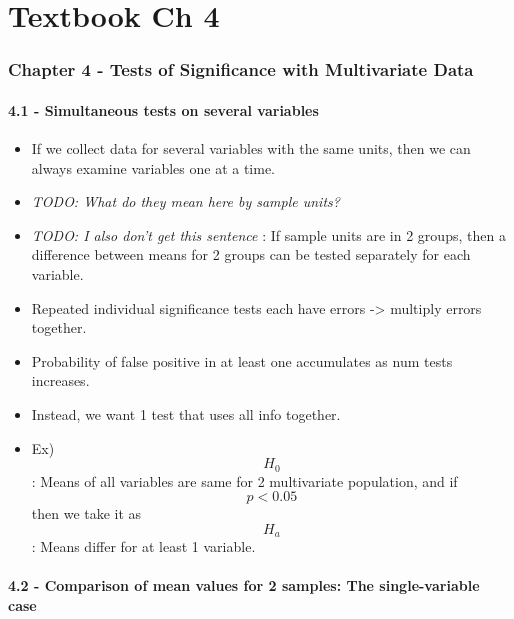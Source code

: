 \hypertarget{textbook-ch-4}{%
\chapter{Textbook Ch 4}\label{textbook-ch-4}}

\hypertarget{chapter-4---tests-of-significance-with-multivariate-data}{%
\subsection{Chapter 4 - Tests of Significance with Multivariate
Data}\label{chapter-4---tests-of-significance-with-multivariate-data}}

\hypertarget{simultaneous-tests-on-several-variables}{%
\subsubsection{4.1 - Simultaneous tests on several
variables}\label{simultaneous-tests-on-several-variables}}

\begin{itemize}
\tightlist
\item
  If we collect data for several variables with the same units, then we
  can always examine variables one at a time.
\item
  \emph{TODO: What do they mean here by sample units?}
\item
  \emph{TODO: I also don't get this sentence} : If sample units are in 2
  groups, then a difference between means for 2 groups can be tested
  separately for each variable.
\item
  Repeated individual significance tests each have errors
  -\textgreater{} multiply errors together.
\item
  Probability of false positive in at least one accumulates as num tests
  increases.
\item
  Instead, we want 1 test that uses all info together.
\item
  Ex) \[H_0\]: Means of all variables are same for 2 multivariate
  population, and if \[p < 0.05\] then we take it as \[H_a\]: Means
  differ for at least 1 variable.
\end{itemize}

\hypertarget{comparison-of-mean-values-for-2-samples-the-single-variable-case}{%
\subsubsection{4.2 - Comparison of mean values for 2 samples: The
single-variable
case}\label{comparison-of-mean-values-for-2-samples-the-single-variable-case}}


